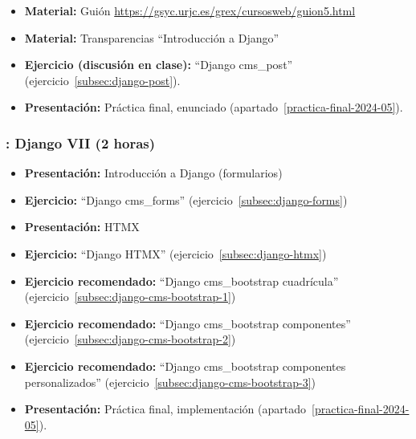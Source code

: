 \documentclass[a4paper,12pt]{article}
\begin{document}
\begin{itemize}

 \item \textbf{Material:} Guión \url{https://gsyc.urjc.es/grex/cursosweb/guion5.html}
 \item \textbf{Material:} Transparencias ``Introducción a Django''
 \item \textbf{Ejercicio (discusión en clase):} ``Django cms\_post'' (ejercicio~\ref{subsec:django-post}).
\item \textbf{Presentación:} Práctica final, enunciado (apartado~\ref{practica-final-2024-05}).
\end{itemize}

\subsubsection{\martesM: Django VII (2 horas)}
\label{cal:martesM}

\begin{itemize}
  \item \textbf{Presentación:} Introducción a Django (formularios)
  \item \textbf{Ejercicio:} ``Django cms\_forms'' (ejercicio~\ref{subsec:django-forms}) \\
  \item \textbf{Presentación:} HTMX
  \item \textbf{Ejercicio:} ``Django HTMX'' (ejercicio~\ref{subsec:django-htmx})
  \item \textbf{Ejercicio recomendado:} ``Django cms\_bootstrap cuadrícula'' (ejercicio~\ref{subsec:django-cms-bootstrap-1})
   \item \textbf{Ejercicio recomendado:} ``Django cms\_bootstrap componentes'' (ejercicio~\ref{subsec:django-cms-bootstrap-2})
   \item \textbf{Ejercicio recomendado:} ``Django cms\_bootstrap componentes personalizados'' (ejercicio~\ref{subsec:django-cms-bootstrap-3})
\item \textbf{Presentación:} Práctica final, implementación (apartado~\ref{practica-final-2024-05}).
\end{itemize}
\end{document}

